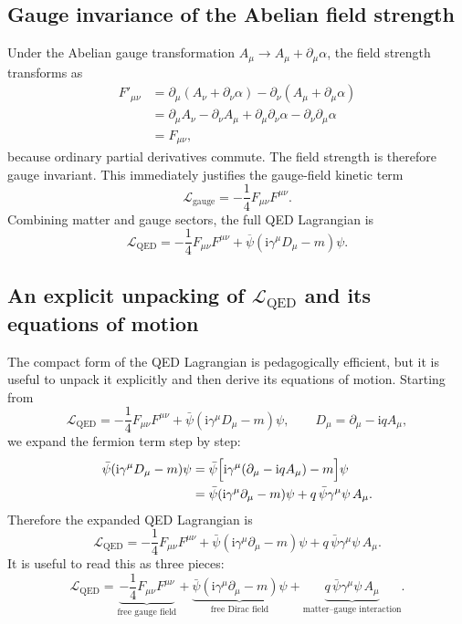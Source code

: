 \documentclass[11pt,a4paper]{article}
\newcommand{\Lag}{\mathcal{L}}
\newcommand{\ii}{\mathrm{i}}
\newcommand{\p}{\partial}
\newcommand{\gmu}{\gamma^\mu}
\newcommand{\psibar}{\overline{\psi}}
\begin{document}
\subsection{Gauge invariance of the Abelian field strength}

Under the Abelian gauge transformation \(A_\mu\to A_\mu+\p_\mu\alpha\), the field strength transforms as
\begin{align}
F'_{\mu\nu}
&=
\p_\mu(A_\nu+\p_\nu\alpha)-\p_\nu(A_\mu+\p_\mu\alpha)
\nonumber\\
&=
\p_\mu A_\nu-\p_\nu A_\mu + \p_\mu\p_\nu\alpha-\p_\nu\p_\mu\alpha
\nonumber\\
&=
F_{\mu\nu},
\end{align}
because ordinary partial derivatives commute. The field strength is therefore gauge invariant. This immediately justifies the gauge-field kinetic term
\begin{equation}
\Lag_{\text{gauge}}=-\frac14 F_{\mu\nu}F^{\mu\nu}.
\label{eq:abelian-gauge-kinetic-expanded}
\end{equation}
Combining matter and gauge sectors, the full QED Lagrangian is
\begin{equation}
\Lag_{\text{QED}}=-\frac14F_{\mu\nu}F^{\mu\nu}+\psibar(\ii\gmu D_\mu-m)\psi.
\label{eq:qed-full-expanded-edition}
\end{equation}



\subsection{An explicit unpacking of \texorpdfstring{$\Lag_{\text{QED}}$}{LQED} and its equations of motion}

The compact form of the QED Lagrangian is pedagogically efficient, but it is useful to unpack it explicitly and then derive its equations of motion. Starting from
\begin{equation}
	\Lag_{\text{QED}}
	=
	-\frac14 F_{\mu\nu}F^{\mu\nu}
	+
	\bar\psi(\ii\gmu D_\mu-m)\psi,
	\qquad
	D_\mu=\p_\mu-\ii qA_\mu,
	\label{eq:LQED-compact-recalled}
\end{equation}
we expand the fermion term step by step:
\begin{align}
	\bar\psi(\ii\gmu D_\mu-m)\psi
	&=
	\bar\psi\Bigl[\ii\gmu(\p_\mu-\ii qA_\mu)-m\Bigr]\psi
	\nonumber\\
	&=
	\bar\psi(\ii\gmu\p_\mu-m)\psi
	+
	q\,\bar\psi\gmu\psi\,A_\mu.
	\label{eq:qed-matter-expansion}
\end{align}
Therefore the expanded QED Lagrangian is
\begin{equation}
	\Lag_{\text{QED}}
	=
	-\frac14 F_{\mu\nu}F^{\mu\nu}
	+
	\bar\psi(\ii\gmu\p_\mu-m)\psi
	+
	q\,\bar\psi\gmu\psi\,A_\mu.
	\label{eq:LQED-expanded}
\end{equation}
It is useful to read this as three pieces:
\begin{equation}
	\Lag_{\text{QED}}
	=
	\underbrace{-\frac14 F_{\mu\nu}F^{\mu\nu}}_{\text{free gauge field}}
	+
	\underbrace{\bar\psi(\ii\gmu\p_\mu-m)\psi}_{\text{free Dirac field}}
	+
	\underbrace{q\,\bar\psi\gmu\psi\,A_\mu}_{\text{matter--gauge interaction}}.
	\label{eq:LQED-three-pieces}
\end{equation}
\end{document}
